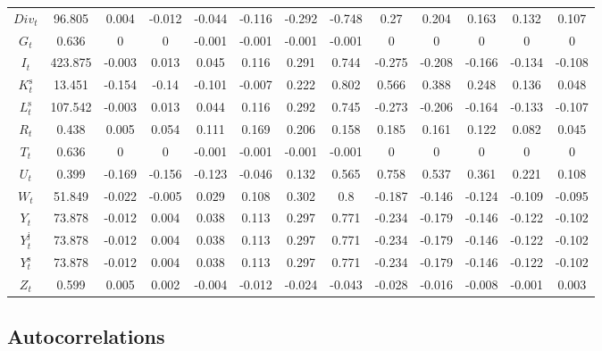 \begin{tabular}{c|c|c|c|c|c|c|c|c|c|c|c|c|}
${D\!i\!v}_{t}$ & 96.805 & 0.004 & -0.012 & -0.044 & -0.116 & -0.292 & -0.748 & 0.27 & 0.204 & 0.163 & 0.132 & 0.107 \\
$G_{t}$ & 0.636 & 0 & 0 & -0.001 & -0.001 & -0.001 & -0.001 & 0 & 0 & 0 & 0 & 0 \\
$I_{t}$ & 423.875 & -0.003 & 0.013 & 0.045 & 0.116 & 0.291 & 0.744 & -0.275 & -0.208 & -0.166 & -0.134 & -0.108 \\
$K^{\mathrm{s}}_{t}$ & 13.451 & -0.154 & -0.14 & -0.101 & -0.007 & 0.222 & 0.802 & 0.566 & 0.388 & 0.248 & 0.136 & 0.048 \\
$L^{\mathrm{s}}_{t}$ & 107.542 & -0.003 & 0.013 & 0.044 & 0.116 & 0.292 & 0.745 & -0.273 & -0.206 & -0.164 & -0.133 & -0.107 \\
$R_{t}$ & 0.438 & 0.005 & 0.054 & 0.111 & 0.169 & 0.206 & 0.158 & 0.185 & 0.161 & 0.122 & 0.082 & 0.045 \\
$T_{t}$ & 0.636 & 0 & 0 & -0.001 & -0.001 & -0.001 & -0.001 & 0 & 0 & 0 & 0 & 0 \\
$U_{t}$ & 0.399 & -0.169 & -0.156 & -0.123 & -0.046 & 0.132 & 0.565 & 0.758 & 0.537 & 0.361 & 0.221 & 0.108 \\
$W_{t}$ & 51.849 & -0.022 & -0.005 & 0.029 & 0.108 & 0.302 & 0.8 & -0.187 & -0.146 & -0.124 & -0.109 & -0.095 \\
$Y_{t}$ & 73.878 & -0.012 & 0.004 & 0.038 & 0.113 & 0.297 & 0.771 & -0.234 & -0.179 & -0.146 & -0.122 & -0.102 \\
$Y^{\mathrm{j}}_{t}$ & 73.878 & -0.012 & 0.004 & 0.038 & 0.113 & 0.297 & 0.771 & -0.234 & -0.179 & -0.146 & -0.122 & -0.102 \\
$Y^{\mathrm{s}}_{t}$ & 73.878 & -0.012 & 0.004 & 0.038 & 0.113 & 0.297 & 0.771 & -0.234 & -0.179 & -0.146 & -0.122 & -0.102 \\
$Z_{t}$ & 0.599 & 0.005 & 0.002 & -0.004 & -0.012 & -0.024 & -0.043 & -0.028 & -0.016 & -0.008 & -0.001 & 0.003 \\
\hline
\end{tabular}


\subsection{Autocorrelations}

